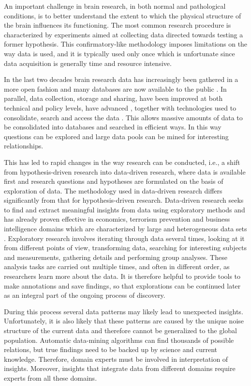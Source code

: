 \documentclass{frontiersHLTH}
\begin{document}
An important challenge in brain research, in both normal and pathological conditions, is to better understand the extent to which the physical structure of the brain influences its functioning. The most common research procedure is characterized by experiments aimed at collecting data directed towards testing a former hypothesis. This confirmatory-like methodology imposes limitations on the way data is used, and it is typically used only once which is unfortunate since data acquisition is generally time and resource intensive.


In the last two decades brain research data has increasingly been gathered in a more open fashion and many databases are now available to the public \cite{milham_open_2012}. In parallel, data collection, storage and sharing, have been improved at both technical and policy levels, have advanced \cite{eckersley_neuroscience_2003}, together with technologies used to consolidate, search and access the data \cite{van_horn_is_2009,wood_harnessing_2014}. This allows massive amounts of data to be consolidated into databases and searched in efficient ways. In this way questions can be explored and large data pools can be mined for interesting relationships.


This has led to rapid changes in the way research can be conducted, i.e., a shift from hypothesis-driven research into data-driven research, where data is available first and research questions and hypotheses are formulated on the basis of exploration of data. The methodology used in data-driven research differs significantly from that for hypothesis-driven research. Data-driven research seeks to find and extract meaningful insights from data using exploratory methods \cite{tukey_we_1980} and has already proven effective in economics, terrorism prevention and business intelligence domains which are characterized by large and heterogeneous data sets \cite{cook_illuminating_2005}. Exploratory research involves iterating through data several times, looking at it from different points of view, transforming data, searching for interesting subjects and measurements, gathering details and performing group analyses. These analysis tasks are carried out multiple times, and often in different order, as researchers learn more about the data. It is therefore helpful to provide tools to make annotations and save findings, so that explorations can be continued later as an integral part of the ongoing process of discovery.


During this process several data patterns may likely lead to unexpected insights. Unfortunately, it is also likely that these patterns are caused by the unique noise structure of the current data and therefore cannot be generalized to the global population. Automatic data-mining algorithms can find thousands of possible relations, but true findings need to be backed up by science and current knowledge.  Therefore, domain experts must be involved in interpretation of insights. Moreover, insights that integrate data from different domains require experts from all these domains.
\end{document}
